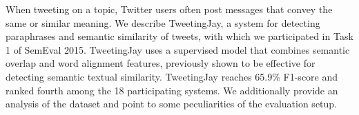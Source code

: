 When tweeting on a topic, Twitter users often post messages that convey the same or similar meaning. We describe TweetingJay, a system for detecting paraphrases and semantic similarity of tweets, with which we participated in Task 1 of SemEval 2015. TweetingJay uses a supervised model that combines semantic overlap and word alignment features, previously shown to be effective for detecting semantic textual similarity. TweetingJay reaches 65.9\% F1-score and ranked fourth among the 18 participating systems. We additionally provide an analysis of the dataset and point to some peculiarities of the evaluation setup.
